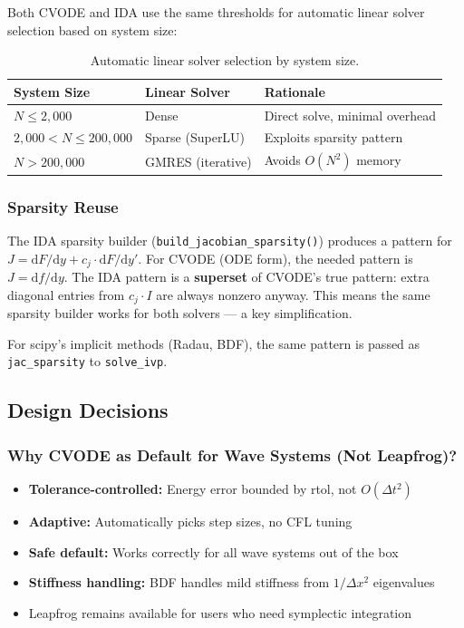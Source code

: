 Both CVODE and IDA use the same thresholds for automatic linear solver
selection based on system size:

\begin{table}[htbp]
\centering
\caption{Automatic linear solver selection by system size.}
\label{tab:linear-solver}
\begin{tabular}{@{}lll@{}}
\toprule
System Size & Linear Solver & Rationale \\
\midrule
$N \leq 2{,}000$ & Dense & Direct solve, minimal overhead \\
$2{,}000 < N \leq 200{,}000$ & Sparse (SuperLU) & Exploits sparsity pattern \\
$N > 200{,}000$ & GMRES (iterative) & Avoids $O(N^2)$ memory \\
\bottomrule
\end{tabular}
\end{table}

\subsubsection{Sparsity Reuse}
\label{sec:sparsity-reuse}

The IDA sparsity builder (\texttt{build\_jacobian\_sparsity()}) produces a pattern
for $J = \mathrm{d}F/\mathrm{d}y + c_j \cdot \mathrm{d}F/\mathrm{d}y'$. For CVODE (ODE form), the needed pattern
is $J = \mathrm{d}f/\mathrm{d}y$. The IDA pattern is a \textbf{superset} of CVODE's true pattern:
extra diagonal entries from $c_j \cdot I$ are always nonzero anyway. This means
the same sparsity builder works for both solvers --- a key simplification.

For scipy's implicit methods (Radau, BDF), the same pattern is passed as
\texttt{jac\_sparsity} to \texttt{solve\_ivp}.

\subsection{Design Decisions}
\label{sec:design-decisions}

\subsubsection{Why CVODE as Default for Wave Systems (Not Leapfrog)?}
\label{sec:why-cvode}

\begin{itemize}
  \item \textbf{Tolerance-controlled:} Energy error bounded by rtol, not $O(\Delta t^2)$
  \item \textbf{Adaptive:} Automatically picks step sizes, no CFL tuning
  \item \textbf{Safe default:} Works correctly for all wave systems out of the box
  \item \textbf{Stiffness handling:} BDF handles mild stiffness from $1/\Delta x^2$ eigenvalues
  \item Leapfrog remains available for users who need symplectic integration
\end{itemize}

